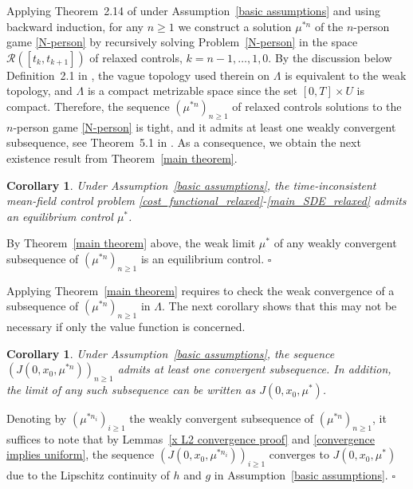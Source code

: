\documentclass[12pt]{article}
\newtheorem{corollary}[prop]{Corollary}
\theoremstyle{named}
\numberwithin{equation}{section}
\newenvironment{Proof}{\removelastskip\par\medskip \noindent{\em Proof.} \rm}{\penalty-20\null\hfill$\square$\par\medbreak}
\let\oldcitet=\citet
\renewcommand{\cite}[1]{\textcolor[rgb]{0,0,1}{\oldcitet{#1}}}
\renewcommand{\citet}[1]{\textcolor[rgb]{0,0,1}{\oldcitet{#1}}}
\begin{document}
\noindent
Applying Theorem~2.14 of \cite{bahlali2018relaxed}
under Assumption~\ref{basic assumptions} and using backward induction, for any ${n} \geq 1$
we construct a solution $\mu^{*n}$ of
the $n$-person game \eqref{N-person}
by recursively solving Problem~\eqref{N-person}
in the space $\mathcal{R}( [t_k ,t_{k+1}] )$
of relaxed controls, $k={n}-1, \ldots ,1 , 0$.
By the discussion below
Definition~2.1 in \cite{el1987compactification},
the vague topology used therein on $\Lambda$
is equivalent to the weak topology,
and $\Lambda$ is a compact metrizable space
since the set $[0,T]\times U$ is compact.
Therefore, the sequence
 $(\mu^{*n} )_{{n} \geq 1}$ of relaxed controls
 solutions to the %
 $n$-person game \eqref{N-person} is tight,
 and it admits at least one weakly convergent subsequence, see Theorem~5.1
in \cite{billingsley1999}.
As a consequence, we obtain
the next existence result from Theorem~\ref{main theorem}.
\begin{corollary}
\label{existence}
 Under Assumption~\ref{basic assumptions},
 the time-inconsistent mean-field control problem
 \eqref{cost_functional_relaxed}-\eqref{main_SDE_relaxed}
 admits an equilibrium control $\mu^*$.
\end{corollary}
\begin{Proof}
 By Theorem~\ref{main theorem} above,
 the weak limit $\mu^*$ of any weakly convergent subsequence
 of $(\mu^{*n} )_{{n} \geq 1}$
  is an equilibrium control.
\end{Proof}
\noindent
\noindent
Applying Theorem~\ref{main theorem} requires to check the
weak convergence of a subsequence of $(\mu^{*n} )_{{n}\geq 1}$
in $\Lambda$.
The next corollary shows that this may not be necessary
 if only the value function is concerned.
\begin{corollary}
  \label{main corollary}
  Under Assumption~\ref{basic assumptions},
  the sequence $(J(0, x_0 , \mu^{*n}))_{n \ge 1}$
  admits at least one convergent subsequence.
  In addition, the limit of any such subsequence
  can be written as $J(0, x_0 , \mu^*)$.
\end{corollary}
\begin{Proof}
  Denoting by $( \mu^{*n_i})_{ i \geq 1 }$
  the weakly convergent subsequence of
  $( \mu^{*n})_{ n \geq 1 }$, it suffices to note that
  by Lemmas~\ref{x L2 convergence proof} and \ref{convergence implies uniform},
  the sequence
  $\left( J(0, x_0, \mu^{*n_i})\right)_{ i \geq 1 } $ converges to $J(0, x_0, \mu^*)$
  due to the Lipschitz continuity of $h$ and $g$ in Assumption~\ref{basic assumptions}.
\end{Proof}
\end{document}
